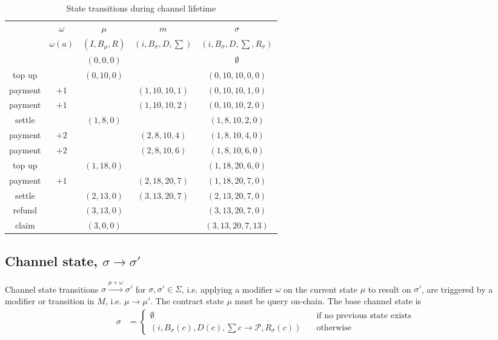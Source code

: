 \documentclass{llncs}
\begin{document}
\begin{table}[t]
  \begin{tabularx}{\textwidth}{| S | S | C | C | C |}
       & $\omega$ & $\mu$ & $m$ & $\sigma$ \\ 
       & $\omega(a)$ & $(I,B_\mu,R)$ & $(i,B_\sigma,D,\sum)$ & $(i,B_\sigma,D,\sum,R_\sigma)$ \\
  \hhline{~====}
       & & $(0,0,0)$ & & $\emptyset$ \\ 
      top up & & $(0,10,0)$ & & $(0,10,10,0,0)$ \\
      payment & $+1$ & & $(1, 10, 10, 1)$& $(0, 10, 10, 1, 0)$ \\
      payment & $+1$ & & $(1, 10, 10, 2)$& $(0, 10, 10, 2, 0)$ \\
      settle & & $(1,8,0)$ & & $(1,8,10,2,0)$ \\
      payment & $+2$  & & $(2, 8, 10, 4)$ & $(1, 8, 10, 4, 0)$ \\
      payment & $+2$  & & $(2, 8, 10, 6)$ & $(1, 8, 10, 6, 0)$ \\
      top up & & $(1,18,0)$ & & $(1, 18, 20, 6, 0)$ \\
      payment & $+1$ & & $(2, 18, 20, 7)$ & $(1, 18, 20, 7, 0)$ \\
      settle & & $(2,13,0)$ & $(3,13,20,7)$ & $(2,13,20,7,0)$ \\
      refund & & $(3,13,0)$ & & $(3,13,20,7,0)$ \\
      claim & & $(3,0,0)$ & & $(3,13,20,7,13)$ \\
  \end{tabularx}
  \medskip
  \caption{State transitions during channel lifetime}
\end{table}

\subsection{Channel state, $\sigma \rightarrow \sigma'$} Channel state transitions $\sigma \xrightarrow{\mu + \omega} \sigma'$ for $\sigma, \sigma' \in \Sigma$, i.e. applying a modifier $\omega$ on the current state $\mu$ to result on $\sigma'$, are triggered by a modifier or transition in $M$, i.e. $\mu \rightarrow \mu'$. The contract state $\mu$ must be query on-chain. The base channel state is
\begin{equation*}
\begin{split}
  \sigma &=
  \begin{cases}
    \emptyset & \quad \text{if no previous state exists} \\
      (i, B_\sigma(c), D(c), \textstyle \sum c \rightarrow \mathcal{P},R_\sigma(c)) & \quad \text{otherwise}
  \end{cases}
\end{split}
\end{equation*}
\end{document}
